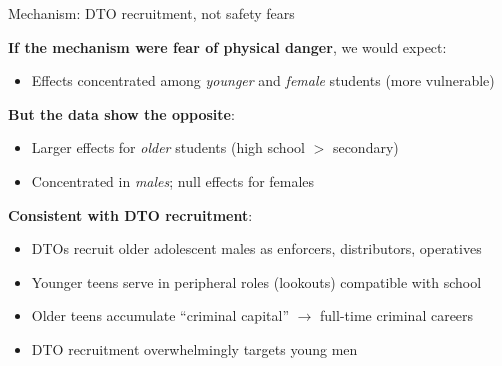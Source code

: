 \documentclass[aspectratio=169]{beamer}
\begin{document}
\begin{frame}{Mechanism: DTO recruitment, not safety fears}

\textbf{If the mechanism were fear of physical danger}, we would expect:
\begin{itemize}
    \item Effects concentrated among \textit{younger} and \textit{female} students (more vulnerable)
\end{itemize}

\vspace{0.4cm}
\pause

\textbf{But the data show the opposite}:
\begin{itemize}
    \item Larger effects for \textit{older} students (high school $>$ secondary)
    \item Concentrated in \textit{males}; null effects for females
\end{itemize}

\vspace{0.4cm}
\pause

\textbf{Consistent with DTO recruitment}:
\begin{itemize}
    \item DTOs recruit older adolescent males as enforcers, distributors, operatives
    \item Younger teens serve in peripheral roles (lookouts) compatible with school
    \item Older teens accumulate ``criminal capital'' $\rightarrow$ full-time criminal careers \citep{Sviatschi2022}
    \item DTO recruitment overwhelmingly targets young men
\end{itemize}

\end{frame}
\end{document}
